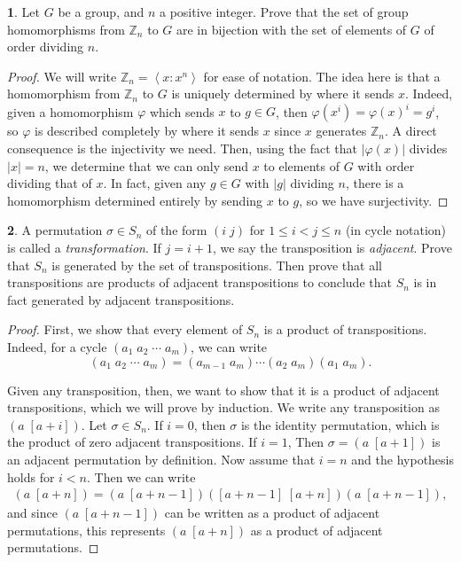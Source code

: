 \documentclass[12pt]{article}
\theoremstyle{definition}
\newtheorem{ex}{}
\begin{document}
\begin{ex}
	Let $G$ be a group, and $n$ a positive integer.
	Prove that the set of group homomorphisms from $\mathbb{Z}_n$ to $G$ are in bijection with the set of elements of $G$ of order dividing $n$.
\end{ex}
\begin{proof}
	We will write $\mathbb{Z}_n = \left\langle x : x^n \right\rangle$ for ease of notation.
	The idea here is that a homomorphism from $\mathbb{Z}_n$ to $G$ is uniquely determined by where it sends $x$.
	Indeed, given a homomorphism $\varphi$ which sends $x$ to $g \in G$, then $\varphi(x^i) = \varphi(x)^i = g^i$, so $\varphi$ is described completely by where it sends $x$ since $x$ generates $\mathbb{Z}_n$.
	A direct consequence is the injectivity we need.
	Then, using the fact that $|\varphi(x)|$ divides $|x|=n$, we determine that we can only send $x$ to elements of $G$ with order dividing that of $x$.
	In fact, given any $g \in G$ with $|g|$ dividing $n$, there is a homomorphism determined entirely by sending $x$ to $g$, so we have surjectivity.
\end{proof}

\begin{ex}
	A permutation $\sigma \in S_n$ of the form $(i\;j)$ for $1 \leq i < j \leq n$ (in cycle notation) is called a \textit{transformation}.
	If $j = i + 1$, we say the transposition is \textit{adjacent}.
	Prove that $S_n$ is generated by the set of transpositions.
	Then prove that all transpositions are products of adjacent transpositions to conclude that $S_n$ is in fact generated by adjacent transpositions.
\end{ex}
\begin{proof}
	First, we show that every element of $S_n$ is a product of transpositions.
	Indeed, for a cycle $(a_1\;a_2\;\cdots\;a_m)$, we can write \begin{equation*}
		(a_1\;a_2\;\cdots\;a_m) = (a_{m-1}\;a_m)\cdots(a_2\;a_m)(a_1\;a_m).
	\end{equation*}

	Given any transposition, then, we want to show that it is a product of adjacent transpositions, which we will prove by induction.
	We write any transposition as $(a\;[a+i])$.
	Let $\sigma \in S_n$.
	If $i = 0$, then $\sigma$ is the identity permutation, which is the product of zero adjacent transpositions.
	If $i = 1$, Then $\sigma = (a\;[a+1])$ is an adjacent permutation by definition.
	Now assume that $i=n$ and the hypothesis holds for $i < n$.
	Then we can write \begin{align*}
		(a\;[a+n]) = (a\;[a+n-1])([a+n-1]\;[a+n])(a\;[a+n-1]),
	\end{align*}
	and since $(a\;[a + n - 1])$ can be written as a product of adjacent permutations, this represents $(a\;[a+n])$ as a product of adjacent permutations.
\end{proof}
\end{document}
